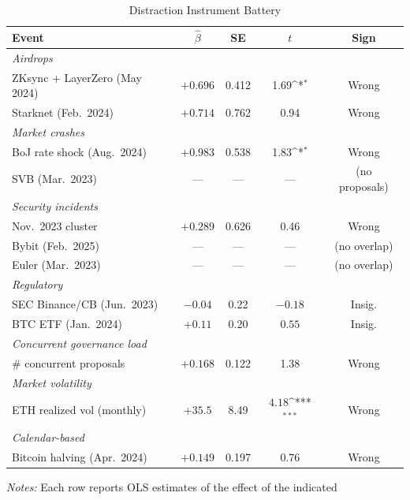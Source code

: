 \documentclass[12pt]{article}
\newcommand{\sym}[1]{\ifmmode^{#1}\else\(^{#1}\)\fi}
\begin{document}
\begin{table}[H]
\centering
\caption{Distraction Instrument Battery}
\label{tab:distraction}
\begin{singlespace}
\begin{tabular}{lcccc}
\toprule
Event & $\hat{\beta}$ & SE & $t$ & Sign \\
\midrule
\multicolumn{5}{l}{\textit{Airdrops}} \\
ZKsync + LayerZero (May 2024) & $+0.696$ & 0.412 & 1.69\sym{*}   & Wrong \\
Starknet (Feb.\ 2024)         & $+0.714$ & 0.762 & 0.94          & Wrong \\
\midrule
\multicolumn{5}{l}{\textit{Market crashes}} \\
BoJ rate shock (Aug.\ 2024)   & $+0.983$ & 0.538 & 1.83\sym{*}   & Wrong \\
SVB (Mar.\ 2023)              & ---     & ---  & ---           & (no proposals) \\
\midrule
\multicolumn{5}{l}{\textit{Security incidents}} \\
Nov.\ 2023 cluster            & $+0.289$ & 0.626 & 0.46         & Wrong \\
Bybit (Feb.\ 2025)            & ---     & ---  & ---           & (no overlap) \\
Euler (Mar.\ 2023)            & ---     & ---  & ---           & (no overlap) \\
\midrule
\multicolumn{5}{l}{\textit{Regulatory}} \\
SEC Binance/CB (Jun.\ 2023)   & $-0.04$ & 0.22 & $-0.18$       & Insig.  \\
BTC ETF (Jan.\ 2024)          & $+0.11$ & 0.20 & $0.55$        & Insig.  \\
\midrule
\multicolumn{5}{l}{\textit{Concurrent governance load}} \\
\# concurrent proposals       & $+0.168$ & 0.122 & 1.38         & Wrong \\
\midrule
\multicolumn{5}{l}{\textit{Market volatility}} \\
ETH realized vol (monthly)    & $+35.5$ & 8.49 & $4.18$\sym{***} & Wrong \\
\midrule
\multicolumn{5}{l}{\textit{Calendar-based}} \\
Bitcoin halving (Apr.\ 2024)  & $+0.149$ & 0.197 & 0.76         & Wrong \\
\bottomrule
\end{tabular}
\begin{flushleft}
\footnotesize\textit{Notes:} Each row reports OLS estimates of the effect of the indicated

\end{flushleft}
\end{singlespace}
\end{table}
\end{document}
